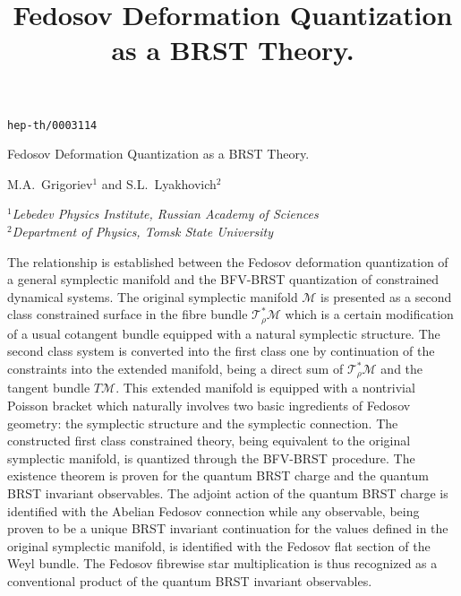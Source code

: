 \documentclass[a4paper,11pt,oneside]{amsart}
\theoremstyle{plain}
\numberwithin{equation}{section} %
\numberwithin{figure}{section} %
\def\mod{{\mathcal T}^*_\rho}
\def\manM{{\mathcal M}}
\begin{document}
\thispagestyle{empty}
\addtolength{\baselineskip}{4pt}
\addtolength{\parskip}{2pt}
\raggedbottom

{\hfill{\lowercase{\tt hep-th/0003114}}\\[12pt]}
\title{Fedosov Deformation Quantization as a BRST Theory.}

\begin{center}
\LARGE{Fedosov Deformation Quantization as a BRST Theory.}
\end{center}

\bigskip

\begin{center}
{\large{M.A.~Grigoriev$^1$ and S.L.~Lyakhovich$^2$}}
\end{center}

\begin{center}
\textit{$^1$Lebedev Physics Institute, Russian Academy of Sciences}\\
\textit{$^2$Department of Physics, Tomsk State University}
\end{center}

\vspace{10mm}

\begin{center}
\begin{minipage}{150mm}
\footnotesize{ The relationship is established between the Fedosov
deformation quantization of a general symplectic manifold and the BFV-BRST
quantization of constrained dynamical systems.  The original symplectic
manifold $\manM$ is presented as a second class constrained surface in the
fibre bundle $\mod\manM$ which is a certain modification of a usual
cotangent bundle equipped with a natural symplectic
structure.  The second class system is converted into the first class one
by continuation of the constraints into the extended manifold, being a
direct sum of $\mod\manM$ and the tangent bundle $T\manM$.  This extended
manifold is equipped with a nontrivial Poisson bracket which naturally
involves two basic ingredients of Fedosov geometry:  the symplectic
structure and the symplectic connection.  The constructed first class
constrained theory, being equivalent to the original symplectic manifold,
is quantized through the BFV-BRST procedure.  The existence theorem is
proven for the quantum BRST charge and the quantum BRST invariant
observables.  The adjoint action of the quantum BRST charge is
identified with the Abelian Fedosov connection while any observable,
being proven to be a unique BRST invariant continuation for the values
defined in the original symplectic manifold, is identified with the
Fedosov flat section of the Weyl bundle.  The Fedosov fibrewise star
multiplication is thus recognized as a conventional
product of the quantum BRST invariant observables.}
\end{minipage}
\end{center}
\end{document}
